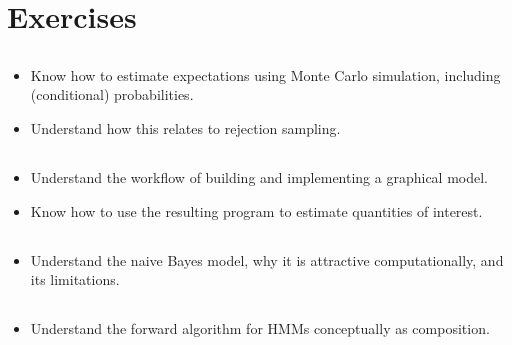 \documentclass[11pt, a4paper]{article}
\begin{document}
\section*{Exercises}
\setcounter{subsection}{0}
\renewcommand{\thesubsection}{\arabic{subsection}}

\subsection{}

\begin{itemize}
  \item Know how to estimate expectations using Monte Carlo simulation, including (conditional) probabilities.
  \item Understand how this relates to rejection sampling.
\end{itemize}

\subsection{}

\begin{itemize}
  \item Understand the workflow of building and implementing a graphical model.
  \item Know how to use the resulting program to estimate quantities of interest.
\end{itemize}

\subsection{}

\begin{itemize}
  \item Understand the naive Bayes model, why it is attractive computationally, and its limitations.
\end{itemize}

\subsection{}

\begin{itemize}
  \item Understand the forward algorithm for HMMs conceptually as composition.
\end{itemize}
\end{document}
